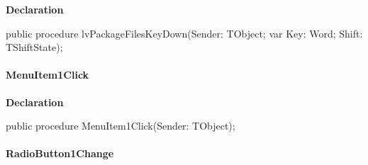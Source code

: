 \documentclass{report}
\newif\ifpdf
\begin{document}
\label{prjwizard.TfrmProjectWizard-lvPackageFilesKeyDown}
\begin{list}{}{
\setlength{\itemindent}{0cm}
\setlength{\listparindent}{0cm}
\setlength{\leftmargin}{\evensidemargin}
\addtolength{\leftmargin}{\tmplength}
\settowidth{\labelsep}{X}
\addtolength{\leftmargin}{\labelsep}
\setlength{\labelwidth}{\tmplength}
}
\item[\textbf{Declaration}\hfill]
\ifpdf
\begin{flushleft}
\fi
\begin{ttfamily}
public procedure lvPackageFilesKeyDown(Sender: TObject; var Key: Word; Shift: TShiftState);\end{ttfamily}

\ifpdf
\end{flushleft}
\fi

\end{list}
\paragraph*{MenuItem1Click}\hspace*{\fill}

\label{prjwizard.TfrmProjectWizard-MenuItem1Click}
\begin{list}{}{
\setlength{\itemindent}{0cm}
\setlength{\listparindent}{0cm}
\setlength{\leftmargin}{\evensidemargin}
\addtolength{\leftmargin}{\tmplength}
\settowidth{\labelsep}{X}
\addtolength{\leftmargin}{\labelsep}
\setlength{\labelwidth}{\tmplength}
}
\item[\textbf{Declaration}\hfill]
\ifpdf
\begin{flushleft}
\fi
\begin{ttfamily}
public procedure MenuItem1Click(Sender: TObject);\end{ttfamily}

\ifpdf
\end{flushleft}
\fi

\end{list}
\paragraph*{RadioButton1Change}\hspace*{\fill}
\end{document}
